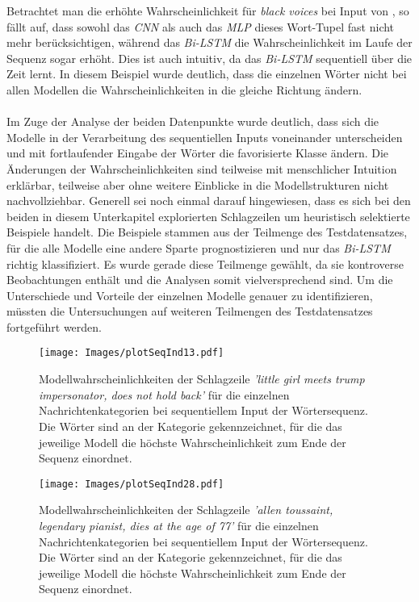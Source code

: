 \documentclass[a4paper,11pt]{article}
\begin{document}
Betrachtet man die erhöhte Wahrscheinlichkeit für \textit{black voices} bei Input von , so fällt auf, dass sowohl das \textit{CNN} als auch das \textit{MLP} dieses Wort-Tupel fast nicht mehr berücksichtigen, während das \textit{Bi-LSTM} die Wahrscheinlichkeit im Laufe der Sequenz sogar erhöht. Dies ist auch intuitiv, da das \textit{Bi-LSTM} sequentiell über die Zeit lernt. In diesem Beispiel wurde deutlich, dass die einzelnen Wörter nicht bei allen Modellen die Wahrscheinlichkeiten in die gleiche Richtung ändern.\\
\\
Im Zuge der Analyse der beiden Datenpunkte wurde deutlich, dass sich die Modelle in der Verarbeitung des sequentiellen Inputs voneinander unterscheiden und mit fortlaufender Eingabe der Wörter die favorisierte Klasse ändern. Die Änderungen der Wahrscheinlichkeiten sind teilweise mit menschlicher Intuition erklärbar, teilweise aber ohne weitere Einblicke in die Modellstrukturen nicht nachvollziehbar. Generell sei noch einmal darauf hingewiesen, dass es sich bei den beiden in diesem Unterkapitel explorierten Schlagzeilen um heuristisch selektierte Beispiele handelt. Die Beispiele stammen aus der Teilmenge des Testdatensatzes, für die alle Modelle eine andere Sparte prognostizieren und nur das \textit{Bi-LSTM} richtig klassifiziert. Es wurde gerade diese Teilmenge gewählt, da sie kontroverse Beobachtungen enthält und die Analysen somit vielversprechend sind. Um die Unterschiede und Vorteile der einzelnen Modelle genauer zu identifizieren, müssten die Untersuchungen auf weiteren  Teilmengen des Testdatensatzes fortgeführt werden.

\begin{figure}[H]
    \centering
\texttt{[image: Images/plotSeqInd13.pdf]} 
\caption{Modellwahrscheinlichkeiten der Schlagzeile \textit{'little girl meets trump impersonator, does not hold back'} für die einzelnen Nachrichtenkategorien bei sequentiellem Input der Wörtersequenz. Die Wörter sind an der Kategorie gekennzeichnet, für die das jeweilige Modell die höchste Wahrscheinlichkeit zum Ende der Sequenz einordnet.}
\label{abb:plotSeqInd13}
\end{figure}


\begin{figure}[H]
    \centering
\texttt{[image: Images/plotSeqInd28.pdf]} 
\caption{Modellwahrscheinlichkeiten der Schlagzeile \textit{'allen toussaint, legendary pianist, dies at the age of 77'} für die einzelnen Nachrichtenkategorien bei sequentiellem Input der Wörtersequenz. Die Wörter sind an der Kategorie gekennzeichnet, für die das jeweilige Modell die höchste Wahrscheinlichkeit zum Ende der Sequenz einordnet.}
\label{abb:plotSeqInd28}
\end{figure}
\end{document}
